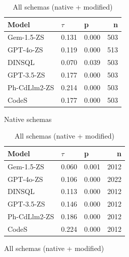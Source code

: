 \begin{table}
  \centering
  \caption{Kendall-Tau ($\tau$) Correlations between \emph{Regular Identifier Proportion} and \emph{Query Precision}.}
  \begin{subfigure}{.5\linewidth}
      \centering
      \caption{Native schemas}
      \begin{tabular}{lllr}
\toprule
Model & $\tau$ & p & n \\
\midrule
Gem-1.5-ZS & 0.131 & 0.000 & 503 \\
GPT-4o-ZS & 0.119 & 0.000 & 513 \\
DINSQL & 0.070 & 0.039 & 503 \\
GPT-3.5-ZS & 0.177 & 0.000 & 503 \\
Ph-CdLlm2-ZS & 0.214 & 0.000 & 503 \\
CodeS & 0.177 & 0.000 & 503 \\
\bottomrule
\end{tabular}

      \label{table:nathigh-precision-ktau-native}
  \end{subfigure}%
  \begin{subfigure}{.5\linewidth}
      \centering
      \caption{All schemas (native + modified)}
      \begin{tabular}{lllr}
\toprule
Model & $\tau$ & p & n \\
\midrule
Gem-1.5-ZS & 0.060 & 0.001 & 2012 \\
GPT-4o-ZS & 0.106 & 0.000 & 2022 \\
DINSQL & 0.113 & 0.000 & 2012 \\
GPT-3.5-ZS & 0.146 & 0.000 & 2012 \\
Ph-CdLlm2-ZS & 0.186 & 0.000 & 2012 \\
CodeS & 0.224 & 0.000 & 2012 \\
\bottomrule
\end{tabular}

      \label{table:nathigh-precision-ktau-all}
  \end{subfigure}
\end{table}

